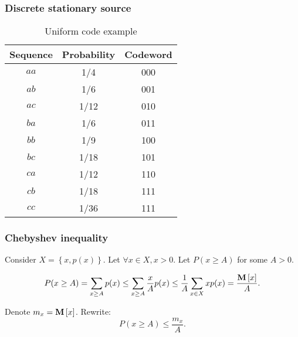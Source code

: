 \documentclass[14pt]{beamer}
\begin{document}
\begin{frame}
\frametitle{Discrete stationary source}
\begin{itemize}

\begin{table}[ht]
\begin{center}
\caption{Uniform code example}
\begin{tabular}{|c|c|c|}
\hline Sequence & Probability & Codeword\\\hline
$aa$& 1/4& 000 \\\hline 
$ab$& 1/6& 001 \\\hline 
$ac$ & 1/12& 010\\\hline 
$ba$& 1/6&  011 \\ \hline 
$bb$&1/9& 100 \\\hline 
$bc$& 1/18&101 \\\hline 
$ca$& 1/12& 110 \\ \hline 
$cb$& 1/18& 111 \\ \hline 
$cc$&1/36& 111 \\ \hline
\end{tabular}
\label{code}
\end{center}
\end{table}

\end{itemize}
\end{frame}



\begin{frame}
\frametitle{Chebyshev inequality}
\begin{itemize}
\small{

    \item Consider $X = \left\{{x,p(x)} \right\}$. Let $\forall x \in X, x>0$. Let $P(x \ge A)$ for some $A > 0$.

    \item 
    \[
    P(x \ge A) = \sum\limits_{x \ge A} {p(x)} \le \sum\limits_{x \ge A}
    {\frac{x}{A}p(x) \le \frac{1}{A}\sum\limits_{x \in X} {xp(x)} } =
    \frac{{\rm {\bf M}}\left[ x \right]}{A}.
    \]
    
    \item Denote $m_x = {\rm {\bf M}}\left[ x \right]$. Rewrite:
    \begin{equation}
    \label{eq22}
    P(x \ge A) \le \frac{m_x }{A}.
    \end{equation}

}
\end{itemize}
\end{frame}
\end{document}
